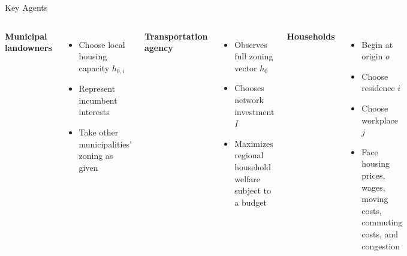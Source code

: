 \documentclass[10pt]{beamer}
\begin{document}
\begin{frame}{Key Agents}
\begin{columns}[T]
\textbf{Municipal landowners}
\begin{itemize}
    \item Choose local housing capacity $h_{0,i}$
    \item Represent incumbent interests
    \item Take other municipalities' zoning as given
\end{itemize}

\textbf{Transportation agency}
\begin{itemize}
    \item Observes full zoning vector $h_0$
    \item Chooses network investment $I$
    \item Maximizes regional household welfare subject to a budget
\end{itemize}

\textbf{Households}
\begin{itemize}
    \item Begin at origin $o$
    \item Choose residence $i$
    \item Choose workplace $j$
    \item Face housing prices, wages, moving costs, commuting costs, and congestion
\end{itemize}
\end{columns}
\end{frame}
\end{document}
